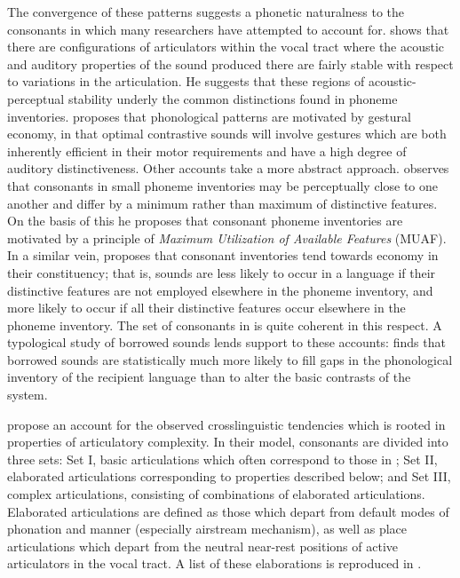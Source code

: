   The convergence of these patterns suggests a phonetic naturalness to the consonants in  which many researchers have attempted to account for. \citet{Stevens1989} shows that there are configurations of articulators within the vocal tract where the acoustic and auditory properties of the sound produced there are fairly stable with respect to variations in the articulation. He suggests that these regions of acoustic-perceptual stability underly the common distinctions found in phoneme inventories. \citet{Maddieson1996} proposes that phonological patterns are motivated by gestural economy, in that optimal contrastive sounds will involve gestures which are both inherently efficient in their motor requirements and have a high degree of auditory distinctiveness. Other accounts take a more abstract approach. \citet{Ohala1979} observes that consonants in small phoneme inventories may be perceptually close to one another and differ by a minimum rather than maximum of distinctive features. On the basis of this he proposes that consonant phoneme inventories are motivated by a principle of \textit{Maximum Utilization of Available Features} (MUAF). In a similar vein, \citet{Clements2003} proposes that consonant inventories tend towards economy in their constituency; that is, sounds are less likely to occur in a language if their distinctive features are not employed elsewhere in the phoneme inventory, and more likely to occur if all their distinctive features occur elsewhere in the phoneme inventory. The set of consonants in  is quite coherent in this respect. A typological study of borrowed sounds lends support to these accounts: \citet{Maddieson1985} finds that borrowed sounds are statistically much more likely to fill gaps in the phonological inventory of the recipient language than to alter the basic contrasts of the system.

  \citet{LindblomMaddieson1988} propose an account for the observed crosslinguistic tendencies which is rooted in properties of articulatory complexity. In their model, consonants are divided into three sets: Set I, basic articulations which often correspond to those in ; Set II, elaborated articulations corresponding to properties described below; and Set III, complex articulations, consisting of combinations of elaborated articulations. Elaborated articulations are defined as those which depart from default modes of phonation and manner (especially airstream mechanism), as well as place articulations which depart from the neutral near-rest positions of active articulators in the vocal tract. A list of these elaborations is reproduced in .

